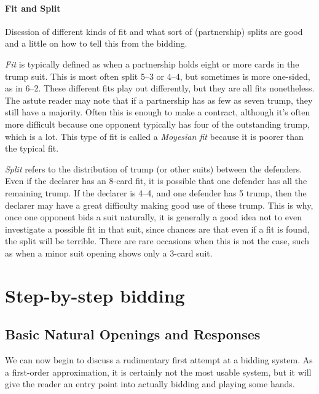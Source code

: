 \documentclass[oneside]{memoir}
\begin{document}
\subsection{Fit and Split}
Discssion of different kinds of fit and what sort of (partnership)
splits are good and a little on how to tell this from the bidding.

\textit{Fit} is typically defined as when a partnership holds eight
or more cards in the trump suit.  This is most often split 5--3 or
4--4, but sometimes is more one-sided, as in 6--2.  These different
fits play out differently, but they are all fits nonetheless.  The
astute reader may note that if a partnership has as few as seven trump,
they still have a majority.  Often this is enough to make a contract,
although it's often more difficult because one opponent typically has
four of the outstanding trump, which is a lot.  This type of fit is
called a \textit{Moyesian fit} because it is poorer than the typical fit.

\textit{Split} refers to the distribution of trump (or other suits)
between the defenders.  Even if the declarer has an 8-card fit, it
is possible that one defender has all the remaining trump.  If the
declarer is 4--4, and one defender has 5 trump, then the declarer may
have a great difficulty making good use of these trump.  This is why,
once one opponent bids a suit naturally, it is generally a good idea
not to even investigate a possible fit in that suit, since chances are
that even if a fit is found, the split will be terrible.  There are
rare occasions when this is not the case, such as when a minor suit
opening shows only a 3-card suit.

\part{Step-by-step bidding}

\chapter{Basic Natural Openings and Responses}
We can now begin to discuss a rudimentary first attempt at a bidding
system.  As a first-order approximation, it is certainly not the most
usable system, but it will give the reader an entry point into actually
bidding and playing some hands.
\end{document}
